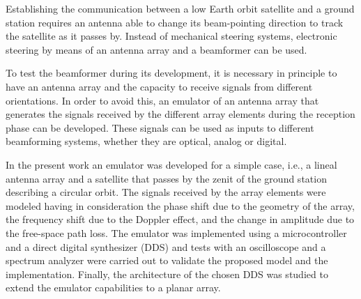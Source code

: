 \documentclass[class=article, crop=false]{standalone}
\begin{document}
Establishing the communication between a low Earth orbit satellite and a ground station requires an antenna able to change its beam-pointing direction to track the satellite as it passes by.
Instead of mechanical steering systems, electronic steering by means of an antenna array and a beamformer can be used.

To test the beamformer during its development, it is necessary in principle to have an antenna array and the capacity to receive signals from different orientations.
In order to avoid this, an emulator of an antenna array that generates the signals received by the different array elements during the reception phase can be developed.
These signals can be used as inputs to different beamforming systems, whether they are optical, analog or digital.

In the present work an emulator was developed for a simple case, i.e., a lineal antenna array and a satellite that passes by the zenit of the ground station describing a circular orbit.
The signals received by the array elements were modeled having in consideration the phase shift due to the geometry of the array, the frequency shift due to the Doppler effect, and the change in amplitude due to the free-space path loss.
The emulator was implemented using a microcontroller and a direct digital synthesizer (DDS) and tests with an oscilloscope and a spectrum analyzer were carried out to validate the proposed model and the implementation.
Finally, the architecture of the chosen DDS was studied to extend the emulator capabilities to a planar array.
\end{document}
